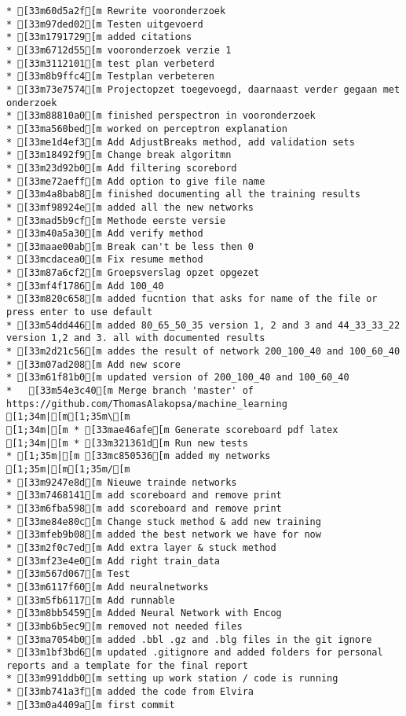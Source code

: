 \begin{verbatim}
* [33m60d5a2f[m Rewrite vooronderzoek
* [33m97ded02[m Testen uitgevoerd
* [33m1791729[m added citations
* [33m6712d55[m vooronderzoek verzie 1
* [33m3112101[m test plan verbeterd
* [33m8b9ffc4[m Testplan verbeteren
* [33m73e7574[m Projectopzet toegevoegd, daarnaast verder gegaan met onderzoek
* [33m88810a0[m finished perspectron in vooronderzoek
* [33ma560bed[m worked on perceptron explanation
* [33me1d4ef3[m Add AdjustBreaks method, add validation sets
* [33m18492f9[m Change break algoritmn
* [33m23d92b0[m Add filtering scorebord
* [33me72aeff[m Add option to give file name
* [33m4a8bab8[m finished documenting all the training results
* [33mf98924e[m added all the new networks
* [33mad5b9cf[m Methode eerste versie
* [33m40a5a30[m Add verify method
* [33maae00ab[m Break can't be less then 0
* [33mcdacea0[m Fix resume method
* [33m87a6cf2[m Groepsverslag opzet opgezet
* [33mf4f1786[m Add 100_40
* [33m820c658[m added fucntion that asks for name of the file or press enter to use default
* [33m54dd446[m added 80_65_50_35 version 1, 2 and 3 and 44_33_33_22 version 1,2 and 3. all with documented results
* [33m2d21c56[m addes the result of network 200_100_40 and 100_60_40
* [33m07ad208[m Add new score
* [33m61f81b0[m updated version of 200_100_40 and 100_60_40
*   [33m54e3c40[m Merge branch 'master' of https://github.com/ThomasAlakopsa/machine_learning
[1;34m|[m[1;35m\[m  
[1;34m|[m * [33mae46afe[m Generate scoreboard pdf latex
[1;34m|[m * [33m321361d[m Run new tests
* [1;35m|[m [33mc850536[m added my networks
[1;35m|[m[1;35m/[m  
* [33m9247e8d[m Nieuwe trainde networks
* [33m7468141[m add scoreboard and remove print
* [33m6fba598[m add scoreboard and remove print
* [33me84e80c[m Change stuck method & add new training
* [33mfeb9b08[m added the best network we have for now
* [33m2f0c7ed[m Add extra layer & stuck method
* [33mf23e4e0[m Add right train_data
* [33m567d067[m Test
* [33m6117f60[m Add neuralnetworks
* [33m5fb6117[m Add runnable
* [33m8bb5459[m Added Neural Network with Encog
* [33mb6b5ec9[m removed not needed files
* [33ma7054b0[m added .bbl .gz and .blg files in the git ignore
* [33m1bf3bd6[m updated .gitignore and added folders for personal reports and a template for the final report
* [33m991ddb0[m setting up work station / code is running
* [33mb741a3f[m added the code from Elvira
* [33m0a4409a[m first commit
\end{verbatim}
